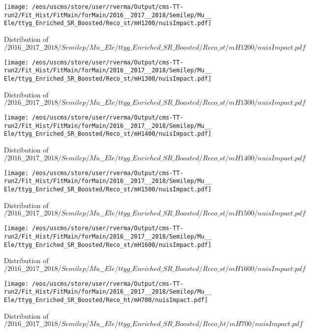\begin{figure}
\centering
\texttt{[image: /eos/uscms/store/user/rverma/Output/cms-TT-run2/Fit\_Hist/FitMain/forMain/2016\_\_2017\_\_2018/Semilep/Mu\_\_Ele/ttyg\_Enriched\_SR\_Boosted/Reco\_st/mH1200/nuisImpact.pdf]}
\caption{Distribution of $/2016\_\_2017\_\_2018/Semilep/Mu\_\_Ele/ttyg\_Enriched\_SR\_Boosted/Reco\_st/mH1200/nuisImpact.pdf$}
\end{figure}

\begin{figure}
\centering
\texttt{[image: /eos/uscms/store/user/rverma/Output/cms-TT-run2/Fit\_Hist/FitMain/forMain/2016\_\_2017\_\_2018/Semilep/Mu\_\_Ele/ttyg\_Enriched\_SR\_Boosted/Reco\_st/mH1300/nuisImpact.pdf]}
\caption{Distribution of $/2016\_\_2017\_\_2018/Semilep/Mu\_\_Ele/ttyg\_Enriched\_SR\_Boosted/Reco\_st/mH1300/nuisImpact.pdf$}
\end{figure}

\begin{figure}
\centering
\texttt{[image: /eos/uscms/store/user/rverma/Output/cms-TT-run2/Fit\_Hist/FitMain/forMain/2016\_\_2017\_\_2018/Semilep/Mu\_\_Ele/ttyg\_Enriched\_SR\_Boosted/Reco\_st/mH1400/nuisImpact.pdf]}
\caption{Distribution of $/2016\_\_2017\_\_2018/Semilep/Mu\_\_Ele/ttyg\_Enriched\_SR\_Boosted/Reco\_st/mH1400/nuisImpact.pdf$}
\end{figure}

\begin{figure}
\centering
\texttt{[image: /eos/uscms/store/user/rverma/Output/cms-TT-run2/Fit\_Hist/FitMain/forMain/2016\_\_2017\_\_2018/Semilep/Mu\_\_Ele/ttyg\_Enriched\_SR\_Boosted/Reco\_st/mH1500/nuisImpact.pdf]}
\caption{Distribution of $/2016\_\_2017\_\_2018/Semilep/Mu\_\_Ele/ttyg\_Enriched\_SR\_Boosted/Reco\_st/mH1500/nuisImpact.pdf$}
\end{figure}

\begin{figure}
\centering
\texttt{[image: /eos/uscms/store/user/rverma/Output/cms-TT-run2/Fit\_Hist/FitMain/forMain/2016\_\_2017\_\_2018/Semilep/Mu\_\_Ele/ttyg\_Enriched\_SR\_Boosted/Reco\_st/mH1600/nuisImpact.pdf]}
\caption{Distribution of $/2016\_\_2017\_\_2018/Semilep/Mu\_\_Ele/ttyg\_Enriched\_SR\_Boosted/Reco\_st/mH1600/nuisImpact.pdf$}
\end{figure}

\begin{figure}
\centering
\texttt{[image: /eos/uscms/store/user/rverma/Output/cms-TT-run2/Fit\_Hist/FitMain/forMain/2016\_\_2017\_\_2018/Semilep/Mu\_\_Ele/ttyg\_Enriched\_SR\_Boosted/Reco\_ht/mH700/nuisImpact.pdf]}
\caption{Distribution of $/2016\_\_2017\_\_2018/Semilep/Mu\_\_Ele/ttyg\_Enriched\_SR\_Boosted/Reco\_ht/mH700/nuisImpact.pdf$}
\end{figure}

